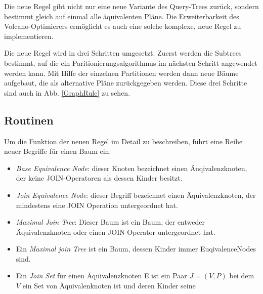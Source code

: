 Die neue Regel gibt nicht nur eine neue Variante des Query-Trees zurück, sondern bestimmt gleich auf einmal alle äquivalenten Pläne. Die Erweiterbarkeit des Volcano-Optimierers ermöglicht es auch eine solche komplexe, neue Regel zu implementieren.

Die neue Regel wird in drei Schritten umgesetzt. Zuerst werden die Subtrees bestimmt, auf die ein Paritionierungsalgorithmus im nächsten Schritt angewendet werden kann. Mit Hilfe der einzelnen Partitionen werden dann neue Bäume aufgebaut, die als alternative Pläne zurückgegeben werden. Diese drei Schritte sind auch in Abb. \ref{GraphRule} zu sehen.

\subsection{Routinen}





Um die Funktion der neuen Regel im Detail zu beschreiben, führt \cite{shanbhag2014optimizing} eine Reihe neuer Begriffe für einen Baum ein:

\begin{itemize}
\item \textit{Base Equivalence Node}: dieser Knoten bezeichnet einen Äuqivalenzknoten, der keine JOIN-Operatoren als dessen Kinder besitzt.
\item \textit{Join Equivalence Node}: dieser Begriff bezeichnet einen Äquivalenzknoten, der mindestens eine JOIN Operation untergeordnet hat.
\item \textit{Maximal Join Tree}: Dieser Baum ist ein Baum, der entweder Äquivalenzknoten oder einen JOIN Operator untergeordnet hat.
\item Ein \textit{Maximal join Tree} ist ein Baum, dessen Kinder immer EuqivalenceNodes sind.
\item Ein \textit{Join Set} für einen Äquivalenzknoten E ist ein Paar $J = (V, P)$ bei dem $V$ ein Set von Äquivalenknoten ist und deren Kinder seine 
\end{itemize}
